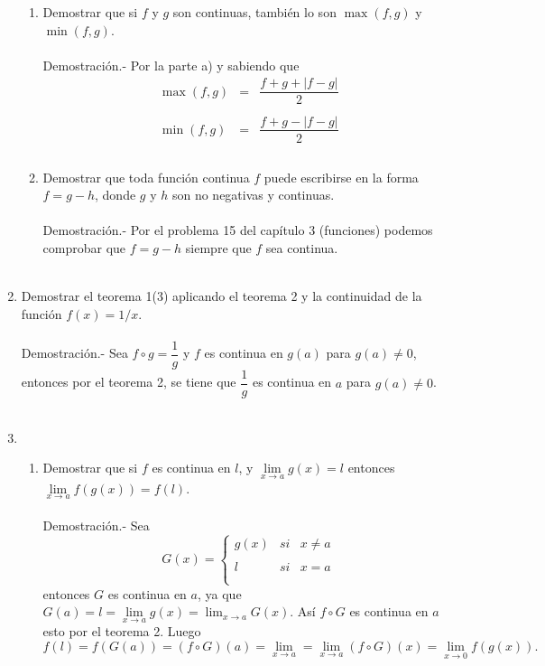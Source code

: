 \begin{enumerate}
\begin{enumerate}[\bfseries (a)]
    \item Demostrar que si $f$ y $g$ son continuas, también lo son $\max(f,g)$ y $\min(f,g)$.\\\\
	Demostración.-\; Por la parte a) y sabiendo que 
	$$\begin{array}{rcl}
	    \max(f,g)&=&\dfrac{f+g+|f-g|}{2}\\\\
	    \min(f,g)&=&\dfrac{f+g-|f-g|}{2}\\\\
	    \end{array}$$

    \item Demostrar que toda función continua $f$ puede escribirse en la forma $f=g-h$, donde $g$ y $h$ son no negativas y continuas.\\\\
	Demostración.-\; Por el problema 15 del capítulo 3 (funciones) podemos comprobar que $f=g-h$ siempre que $f$ sea continua.\\\\ 

\end{enumerate}

\item Demostrar el teorema 1(3) aplicando el teorema 2 y la continuidad de la función $f(x)=1/x$.\\\\
    Demostración.-\; Sea $f\circ g = \dfrac{1}{g}$ y $f$ es continua en $g(a)$ para $g(a)\neq 0$, entonces por el teorema 2, se tiene que $\dfrac{1}{g}$ es continua en $a$ para $g(a)\neq 0$.\\\\

\item 
    \begin{enumerate}[\bfseries (a)]

	\item Demostrar que si $f$ es continua en $l$, y $\lim\limits_{x\to a} g(x) = l$ entonces $\lim\limits_{x\to a}f(g(x)) = f(l)$.\\\\
	    Demostración.-\; Sea 
	    $$G(x) = \left\{\begin{array}{rcl}
		    g(x)&si&x\neq a\\\\
			l&si&x=a\\\\
	    \end{array}\right.$$
	    entonces $G$ es continua en $a$, ya que $G(a)=l=\lim\limits_{x\to a} g(x) = \lim_{x\to a} G(x)$. Así $f\circ G$ es continua en $a$ esto por el teorema 2. Luego 
	    $$f(l)=f(G(a))=(f\circ G)(a) = \lim\limits_{x\to a} = \lim\limits_{x\to a}(f\circ G)(x) = \lim\limits_{x\to 0} f(g(x)).$$\\


\end{enumerate}
\end{enumerate}
